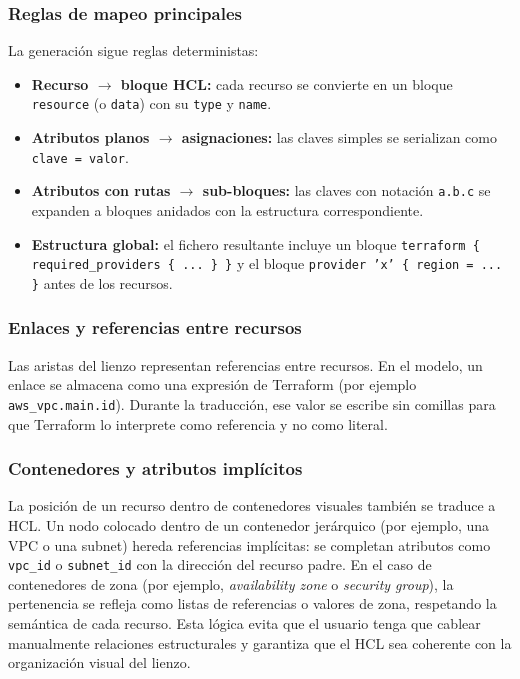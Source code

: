 \documentclass{article}
\begin{document}
{        \subsubsection*{Reglas de mapeo principales}
        \justify
        La generación sigue reglas deterministas:
        \begin{itemize}
            \item \textbf{Recurso $\rightarrow$ bloque HCL:} cada recurso se
            convierte en un bloque \texttt{resource} (o \texttt{data}) con su
            \texttt{type} y \texttt{name}.
            \item \textbf{Atributos planos $\rightarrow$ asignaciones:} las
            claves simples se serializan como \texttt{clave = valor}.
            \item \textbf{Atributos con rutas $\rightarrow$ sub-bloques:} las
            claves con notación \texttt{a.b.c} se expanden a bloques anidados
            con la estructura correspondiente.
            \item \textbf{Estructura global:} el fichero resultante incluye un
            bloque \texttt{terraform \{ required\_providers \{ ... \} \}} y el
            bloque \texttt{provider 'x' \{ region = ... \}} antes de los
            recursos.
        \end{itemize}

        \subsubsection*{Enlaces y referencias entre recursos}
        \justify
        Las aristas del lienzo representan referencias entre recursos. En el
        modelo, un enlace se almacena como una expresión de Terraform (por
        ejemplo \texttt{aws\_vpc.main.id}). Durante la traducción, ese valor se
        escribe sin comillas para que Terraform lo interprete como referencia y
        no como literal.

        \subsubsection*{Contenedores y atributos implícitos}
        \justify
        La posición de un recurso dentro de contenedores visuales también se
        traduce a HCL. Un nodo colocado dentro de un contenedor jerárquico (por
        ejemplo, una VPC o una subnet) hereda referencias implícitas: se
        completan atributos como \texttt{vpc\_id} o \texttt{subnet\_id} con la
        dirección del recurso padre. En el caso de contenedores de zona (por
        ejemplo, \textit{availability zone} o \textit{security group}), la
        pertenencia se refleja como listas de referencias o valores de zona,
        respetando la semántica de cada recurso. Esta lógica evita que el
        usuario tenga que cablear manualmente relaciones estructurales y
        garantiza que el HCL sea coherente con la organización visual del
        lienzo.

}
\end{document}
